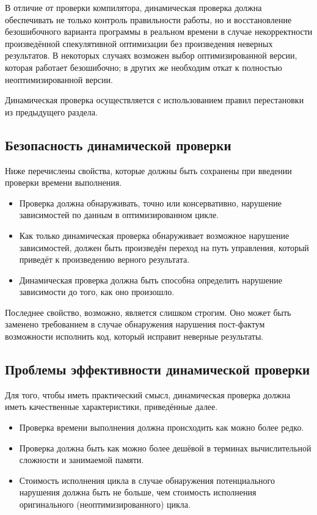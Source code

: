 В отличие от проверки компилятора, динамическая проверка должна обеспечивать не только контроль правильности работы, но и восстановление безошибочного варианта программы в реальном времени в случае некорректности произведённой спекулятивной оптимизации без произведения неверных результатов. В некоторых случаях возможен выбор оптимизированной версии, которая работает безошибочно; в других же необходим откат к полностью неоптимизированной версии.

Динамическая проверка осуществляется с использованием правил перестановки из предыдущего раздела.

\subsection{Безопасность динамической проверки}

Ниже перечислены свойства, которые должны быть сохранены при введении проверки времени выполнения.

\begin{itemize}
	\item Проверка должна обнаруживать, точно или консервативно, нарушение зависимостей по данным в оптимизированном цикле.
	\item Как только динамическая проверка обнаруживает возможное нарушение зависимостей, должен быть произведён переход на путь управления, который приведёт к произведению верного результата.
	\item Динамическая проверка должна быть способна определить нарушение зависимости до того, как оно произошло.
\end{itemize}

Последнее свойство, возможно, является слишком строгим. Оно может быть заменено требованием в случае обнаружения нарушения пост-фактум возможности исполнить код, который исправит неверные результаты.

\subsection{Проблемы эффективности динамической проверки}

Для того, чтобы иметь практический смысл, динамическая проверка должна иметь качественные характеристики, приведённые далее.

\begin{itemize}
	\item Проверка времени выполнения должна происходить как можно более редко.
	\item Проверка должна быть как можно более дешёвой в терминах вычислительной сложности и занимаемой памяти.
	\item Стоимость исполнения цикла в случае обнаружения потенциального нарушения должна быть не больше, чем стоимость исполнения оригинального (неоптимизированного) цикла.
\end{itemize}

